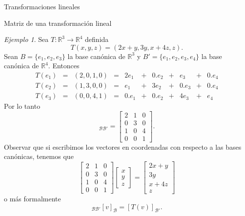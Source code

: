 \documentclass[a4paper,12pt,twoside,spanish,reqno]{amsbook}
\numberwithin{equation}{section}
\theoremstyle{definition}
\theoremstyle{remark}
\newtheorem*{ejemplo*}{Ejemplo}
\newcommand{\R}{\mathbb R}
\begin{document}
\begin{chapter}{Transformaciones lineales}
\begin{section}{Matriz de una transformación lineal}
            \begin{ejemplo*}
                Sea $T: \R^3 \to \R^4$ definida
                $$
                T(x,y,z) = (2x+y, 3y, x+4z,z).
                $$
                Sean  $B = \{e_1,e_2,e_3\}$ la base canónica de $\R^3$ y  $B' = \{e_1,e_2,e_3,e_4\}$ la base canónica de $\R^4$. Entonces
                \begin{equation*}
                    \begin{array}{ccccrcrcrcr}
                    T(e_1) & = & (2,0,1,0) & = &  2e_1& + & 0.e_2& + &   e_3& + & 0.e_4  \\
                    T(e_2) & = & (1,3,0,0) & = &   e_1& + &  3e_2& + & 0.e_3& + & 0.e_4  \\
                    T(e_3) & = & (0,0,4,1) & = & 0.e_1& + & 0.e_2& + &  4e_3& + &   e_4
                    \end{array}
                \end{equation*}
                Por  lo tanto
                \begin{equation*}
                        [T]_{\mathcal B \mathcal B'} =\begin{bmatrix} 2&1&0 \\0&3&0 \\1&0&4 \\0&0&1
                    \end{bmatrix}.
                \end{equation*}
                Observar que si escribimos los vectores en coordenadas con respecto  a las bases canónicas,  tenemos que 
                \begin{equation*}
                \begin{bmatrix} 2&1&0 \\0&3&0 \\1&0&4 \\0&0&1
                \end{bmatrix}
                \begin{bmatrix} x \\ y \\z\end{bmatrix} = 
                \begin{bmatrix} 2x+y\\ 3y\\ x+4z\\z\end{bmatrix}
                \end{equation*}
                o más formalmente
                \begin{equation*}
                    [T]_{\mathcal B \mathcal B'} [v]_{\mathcal B} = [T(v)]_{\mathcal B'}.
                \end{equation*}
            \end{ejemplo*}
        

\end{section}
\end{chapter}
\end{document}
